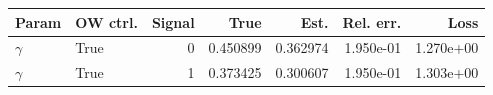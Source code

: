 \begin{tabular}{llrrrrr}
\hline
Param & OW ctrl. & Signal & True & Est. & Rel. err. & Loss \\
\hline
$\gamma$ & True & 0 & 0.450899 & 0.362974 & 1.950e-01 & 1.270e+00 \\
$\gamma$ & True & 1 & 0.373425 & 0.300607 & 1.950e-01 & 1.303e+00 \\
\hline
\end{tabular}
